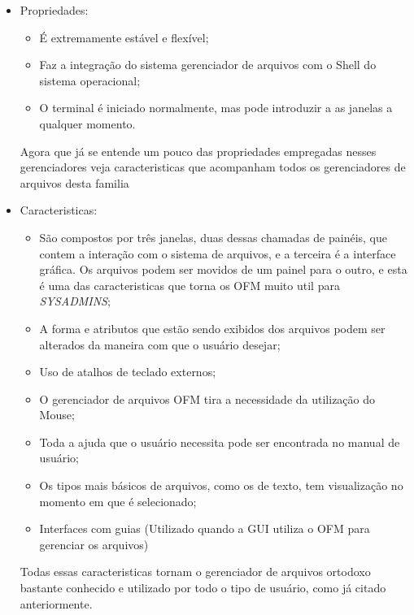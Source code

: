 \documentclass[
	12pt,				%
	openright,			%
	twoside,			%
	a4paper,			%
	chapter=TITLE,		%
	section=TITLE,		%
	english,	
	brazil				%
]{abntex2}
\begin{document}
\begin{itemize}
	\item Propriedades: \\
	\begin{itemize}
		\item É extremamente estável e flexível;
		\item Faz a integração do sistema gerenciador de arquivos com o Shell do sistema operacional;
		\item O terminal é iniciado normalmente, mas pode introduzir a as janelas a qualquer momento.
	\end{itemize}

Agora que já se entende um pouco das propriedades empregadas nesses gerenciadores veja caracteristicas que acompanham todos os gerenciadores de arquivos desta familia

	\item Caracteristicas: \\ 
	\begin{itemize}
		\item São compostos por três janelas, duas dessas chamadas de painéis, que contem a interação com o sistema de arquivos, e a terceira é a interface gráfica. Os arquivos podem ser movidos de um painel para o outro, e esta é uma das caracteristicas que torna os OFM muito util para \textit{SYSADMINS};
		\item A forma e atributos que estão sendo exibidos dos arquivos podem ser alterados da maneira com que o usuário desejar;
		\item Uso de atalhos de teclado externos;
		\item O gerenciador de arquivos OFM tira a necessidade da utilização do Mouse;
		\item Toda a ajuda que o usuário necessita pode ser encontrada no manual de usuário;
		\item Os tipos mais básicos de arquivos, como os de texto, tem visualização no momento em que é selecionado;
		\item Interfaces com guias (Utilizado quando a GUI utiliza o OFM para gerenciar os arquivos)
	\end{itemize}

Todas essas caracteristicas tornam o gerenciador de arquivos ortodoxo bastante conhecido e utilizado por todo o tipo de usuário, como já citado anteriormente.
\end{itemize}

\end{document}
